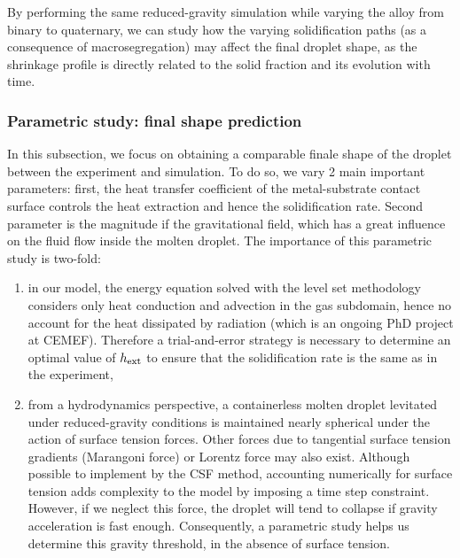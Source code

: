 By performing the same reduced-gravity simulation while varying the alloy from binary to quaternary, we can study 
how the varying solidification paths (as a consequence of macrosegregation) may affect the final droplet shape, 
as the shrinkage profile is directly related to the solid fraction and its evolution with time.

\subsubsection{Parametric study: final shape prediction}

In this subsection, we focus on obtaining a comparable finale shape of the droplet between the experiment and simulation.
To do so, we vary 2 main important parameters: first, the heat transfer coefficient of the metal-substrate contact surface
controls the heat extraction and hence the solidification rate. Second parameter is the magnitude if the gravitational field,
which has a great influence on the fluid flow inside the molten droplet.
The importance of this parametric study is two-fold: 
\begin{enumerate}
\itemsep0em

\item in our model, the energy equation solved with the level set methodology considers only heat conduction 
and advection in the gas subdomain, hence no account for the heat dissipated by radiation (which is an ongoing PhD project at CEMEF). 
Therefore a trial-and-error strategy is necessary to determine an optimal value of $h_{\text{ext}}$ to ensure that the solidification rate is the same
as in the experiment,

\item from a hydrodynamics perspective, a containerless molten droplet levitated under reduced-gravity conditions is maintained nearly spherical 
under the action of surface tension forces. Other forces due to tangential surface tension gradients (Marangoni force) or Lorentz force may also exist.
Although possible to implement by the CSF method, accounting numerically for surface tension adds complexity to the model by imposing
a time step constraint. However, if we neglect this force, the droplet will tend to collapse if gravity acceleration is fast enough.
Consequently, a parametric study helps us determine this gravity threshold, in the absence of surface tension. 
\end{enumerate}

